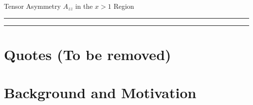 \documentclass[12pt]{article}
\begin{document}
\pagestyle{empty}
 
\begin{center}
 \LARGE{
  Tensor Asymmetry $A_{zz}$ in the $x>1$ Region
 }
\end{center}
%
\hrule \vspace{.05cm}\hrule
%


\newpage

\begin{abstract}
  
\end{abstract}

\newpage


%


\clearpage


\tableofcontents


\pagestyle{plain}

\clearpage

\section{Quotes (To be removed)}


\section{Background and Motivation}

% 
% 

% 

\label{PREDB1X}
%   
\end{document}

